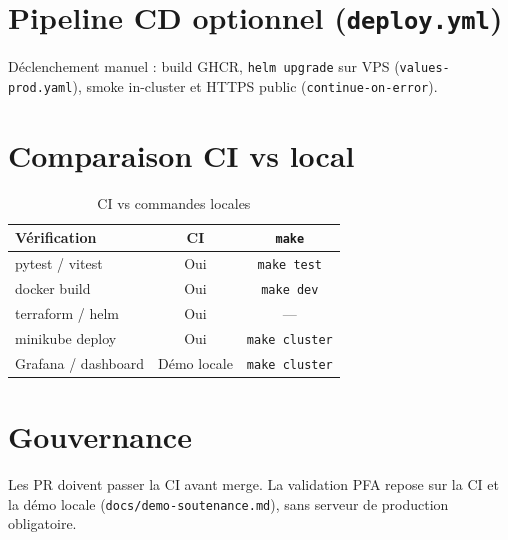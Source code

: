 \section{Pipeline CD optionnel (\texttt{deploy.yml})}

Déclenchement manuel : build GHCR, \texttt{helm upgrade} sur VPS (\texttt{values-prod.yaml}), smoke in-cluster et HTTPS public (\texttt{continue-on-error}).

\section{Comparaison CI vs local}

\begin{table}[htbp]
  \centering
  \caption{CI vs commandes locales}
  \label{tab:ci-vs-make}
  \begin{tabular}{@{}lcc@{}}
    \toprule
    \textbf{Vérification} & \textbf{CI} & \texttt{make} \\
    \midrule
    pytest / vitest & Oui & \texttt{make test} \\
    docker build & Oui & \texttt{make dev} \\
    terraform / helm & Oui & — \\
    minikube deploy & Oui & \texttt{make cluster} \\
    Grafana / dashboard & Démo locale & \texttt{make cluster} \\
    \bottomrule
  \end{tabular}
\end{table}

\section{Gouvernance}

Les PR doivent passer la CI avant merge. La validation PFA repose sur la CI et la démo locale (\texttt{docs/demo-soutenance.md}), sans serveur de production obligatoire.
